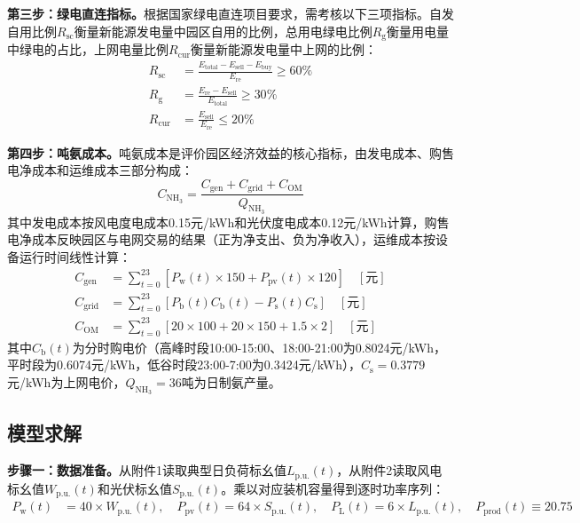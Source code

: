 \textbf{第三步：绿电直连指标。}根据国家绿电直连项目要求，需考核以下三项指标。自发自用比例$R_{\mathrm{sc}}$衡量新能源发电量中园区自用的比例，总用电绿电比例$R_{\mathrm{g}}$衡量用电量中绿电的占比，上网电量比例$R_{\mathrm{cur}}$衡量新能源发电量中上网的比例：
\begin{align}
R_{\mathrm{sc}} &= \frac{E_{\mathrm{total}} - E_{\mathrm{sell}} - E_{\mathrm{buy}}}{E_{\mathrm{re}}} \ge 60\% \label{eq:q1_sc} \\
R_{\mathrm{g}} &= \frac{E_{\mathrm{re}} - E_{\mathrm{sell}}}{E_{\mathrm{total}}} \ge 30\% \label{eq:q1_gr} \\
R_{\mathrm{cur}} &= \frac{E_{\mathrm{sell}}}{E_{\mathrm{re}}} \le 20\% \label{eq:q1_cur}
\end{align}

\textbf{第四步：吨氨成本。}吨氨成本是评价园区经济效益的核心指标，由发电成本、购售电净成本和运维成本三部分构成：
\begin{equation}
C_{\mathrm{NH_3}} = \frac{C_{\mathrm{gen}} + C_{\mathrm{grid}} + C_{\mathrm{OM}}}{Q_{\mathrm{NH_3}}} \label{eq:q1_cost}
\end{equation}
其中发电成本按风电度电成本0.15元/kWh和光伏度电成本0.12元/kWh计算，购售电净成本反映园区与电网交易的结果（正为净支出、负为净收入），运维成本按设备运行时间线性计算：
\begin{align}
C_{\mathrm{gen}} &= \sum_{t=0}^{23} [P_{\mathrm{w}}(t) \times 150 + P_{\mathrm{pv}}(t) \times 120] \quad [\text{元}] \\
C_{\mathrm{grid}} &= \sum_{t=0}^{23} [P_{\mathrm{b}}(t)C_{\mathrm{b}}(t) - P_{\mathrm{s}}(t)C_{\mathrm{s}}] \quad [\text{元}] \\
C_{\mathrm{OM}} &= \sum_{t=0}^{23} [20 \times 100 + 20 \times 150 + 1.5 \times 2] \quad [\text{元}]
\end{align}
其中$C_{\mathrm{b}}(t)$为分时购电价（高峰时段10:00-15:00、18:00-21:00为0.8024元/kWh，平时段为0.6074元/kWh，低谷时段23:00-7:00为0.3424元/kWh），$C_{\mathrm{s}}=0.3779$元/kWh为上网电价，$Q_{\mathrm{NH_3}}=36$吨为日制氨产量。

\subsection{模型求解}

\textbf{步骤一：数据准备。}从附件1读取典型日负荷标幺值$L_{\mathrm{p.u.}}(t)$，从附件2读取风电标幺值$W_{\mathrm{p.u.}}(t)$和光伏标幺值$S_{\mathrm{p.u.}}(t)$。乘以对应装机容量得到逐时功率序列：
\begin{align*}
P_{\mathrm{w}}(t) &= 40 \times W_{\mathrm{p.u.}}(t), \quad
P_{\mathrm{pv}}(t) = 64 \times S_{\mathrm{p.u.}}(t), \quad
P_{\mathrm{L}}(t) = 6 \times L_{\mathrm{p.u.}}(t), \quad
P_{\mathrm{prod}}(t) \equiv 20.75
\end{align*}

